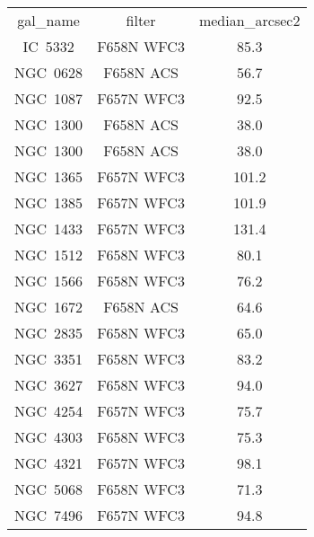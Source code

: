 \begin{table}
\begin{tabular}{ccc}
gal_name & filter & median_arcsec2 \\
IC~5332 & F658N WFC3 & 85.3 \\
NGC~0628 & F658N ACS & 56.7 \\
NGC~1087 & F657N WFC3 & 92.5 \\
NGC~1300 & F658N ACS & 38.0 \\
NGC~1300 & F658N ACS & 38.0 \\
NGC~1365 & F657N WFC3 & 101.2 \\
NGC~1385 & F657N WFC3 & 101.9 \\
NGC~1433 & F657N WFC3 & 131.4 \\
NGC~1512 & F658N WFC3 & 80.1 \\
NGC~1566 & F658N WFC3 & 76.2 \\
NGC~1672 & F658N ACS & 64.6 \\
NGC~2835 & F658N WFC3 & 65.0 \\
NGC~3351 & F658N WFC3 & 83.2 \\
NGC~3627 & F658N WFC3 & 94.0 \\
NGC~4254 & F657N WFC3 & 75.7 \\
NGC~4303 & F658N WFC3 & 75.3 \\
NGC~4321 & F657N WFC3 & 98.1 \\
NGC~5068 & F658N WFC3 & 71.3 \\
NGC~7496 & F657N WFC3 & 94.8 \\
\end{tabular}
\end{table}
